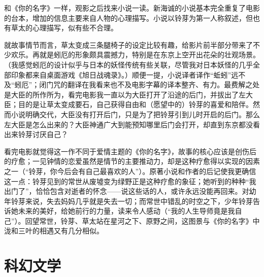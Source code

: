 \par 和《你的名字》一样，观影之后找来小说一读。新海诚的小说基本完全重复了电影的台本，增加的信息主要来自人物的心理描写。小说以铃芽为第一人称叙述，但也有草太的心理描写，似有些不合理。
\par 就故事情节而言，草太变成三条腿椅子的设定比较有趣，给影片前半部分带来了不少欢乐。再就是蚓厄的形象颇具震撼力，特别是在东京上空开出花朵的壮观场景。（我感觉蚓厄的设计似乎与日本的妖怪传统有些关联，尽管我对日本妖怪的几乎全部印象都来自桌面游戏《旭日战魂录》。）顺便一提，小说译者译作“蚯蚓”远不及“蚓厄”；闭门咒的翻译在我看来也不及电影字幕的译本整齐、有力。最费解之处是大臣的所作所为，看完电影我一直以为大臣打开了沿途的后门，并拔出了左大臣；目的是让草太变成要石，自己获得自由和（愿望中的）铃芽的喜爱和陪伴。然而小说明确交代，大臣没有打开后门，只是为了把铃芽引到儿时开启的后门。那么左大臣是怎么出来的？大臣神通广大到能预知哪里后门会打开，却直到东京都没看出来铃芽讨厌自己？
\par 看完电影就觉得这一作不同于爱情主题的《你的名字》，故事的核心应该是创伤后的疗愈；一见钟情的恋爱虽然是情节的主要推动力，却是这种疗愈得以实现的因素之一（“铃芽，你今后会有自己最喜欢的人”）。原著小说和作者的后记使我更确信这一点：铃芽见到的常世从废墟变为绿野正是这种疗愈的象征；她听到的种种“我出门了”，恰恰包含对逝者的怀念——说这些话的人，或许永远没能再回来。对幼年铃芽来说，失去妈妈几乎就是失去一切；而常世中错乱的时空之下，少年铃芽告诉她未来的美好，给她前行的力量，读来令人感动（“我的人生导师竟是我自己”）。回望常世，铃芽、草太站在星河之下、原野之间，这图景与《你的名字》中泷和三叶的相遇又有几分相似。
\par {}


\section{科幻文学}
